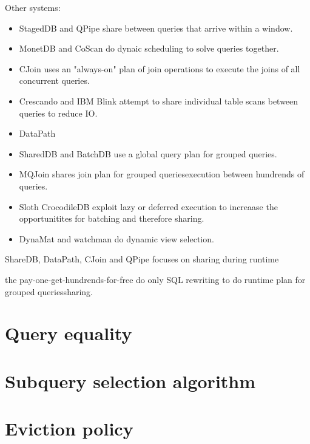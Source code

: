 Other systems:

\begin{itemize}
\item StagedDB \cite{harizopoulosStagedDBDesigningDatabase2005} and QPipe
\cite{harizopoulosQpipeSimultaneouslyPipelined2005} share between
queries that arrive within a window.
\item MonetDB \cite{idreosMonetdbTwoDecades2012} and CoScan
\cite{wangCoscanCooperativeScan2011} do dynaic scheduling to solve
queries together.
\item CJoin \cite{candeaScalablePredictableJoin2009} uses an "always-on"
plan of join operations to execute the joins of all concurrent
queries.
\item Crescando \cite{ssgiannikisCrescando2010} and IBM Blink
\cite{ramanConstanttimeQueryProcessing2008} attempt to share
individual table scans between queries to reduce IO.
\item DataPath \cite{arumugamDataPathSystemDatacentric2010}
\item SharedDB \cite{giannikisSharedDBKillingOne2012} and BatchDB
\cite{makreshanskiBatchDBEfficientIsolated2017} use a global query
plan for grouped queries.
\item MQJoin \cite{makreshanskiMqjoinEfficientShared2016a} shares join
plan for grouped queriesexecution between hundrends of queries.
\item Sloth \cite{cheungSlothBeingLazy2016} CrocodileDB
\cite{shangCrocodileDBEfficientDatabase2020} exploit lazy or deferred
execution to increaase the opportunitites for batching and therefore
sharing.
\item DynaMat \cite{kotidisDynamatDynamicView1999} and watchman
\cite{scheuermannWatchmanDataWarehouse1996} do dynamic view
selection.
\end{itemize}

ShareDB, DataPath, CJoin and QPipe focuses on sharing during runtime

the pay-one-get-hundrends-for-free do only SQL rewriting to do runtime
  plan for grouped queriessharing.


\cite{mounaProResProactiveReselection2022}


\section{Query equality}
\label{sec:orga919a5f}

\section{Subquery selection algorithm}
\label{sec:org70319fb}

\section{Eviction policy}
\label{sec:orgd16def2}


